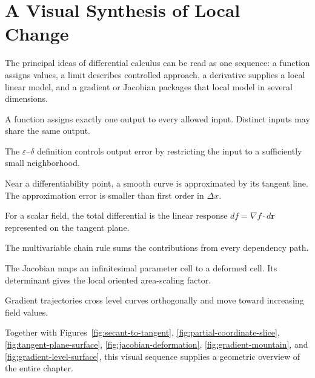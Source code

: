 \section{A Visual Synthesis of Local Change}
\label{sec:calculus-visual-synthesis}

The principal ideas of differential calculus can be read as one sequence: a function assigns values, a limit describes controlled approach, a derivative supplies a local linear model, and a gradient or Jacobian packages that local model in several dimensions.

\begin{bookfigure}[H]{A function assigns exactly one output to every allowed input. Distinct inputs may share the same output.}
\label{fig:function-mapping}

\end{bookfigure}

\begin{bookfigure}[H]{The $\varepsilon$--$\delta$ definition controls output error by restricting the input to a sufficiently small neighborhood.}
\label{fig:epsilon-delta-limit}

\end{bookfigure}

\begin{bookfigure}[H]{Near a differentiability point, a smooth curve is approximated by its tangent line. The approximation error is smaller than first order in $\Delta x$.}
\label{fig:local-linearization}

\end{bookfigure}

\begin{bookfigure}[H]{For a scalar field, the total differential is the linear response $df=\nabla f\cdot d\mathbf r$ represented on the tangent plane.}
\label{fig:total-differential-plane}

\end{bookfigure}

\begin{bookfigure}[H]{The multivariable chain rule sums the contributions from every dependency path.}
\label{fig:chain-rule-graph}

\end{bookfigure}

\begin{bookfigure}[H]{The Jacobian maps an infinitesimal parameter cell to a deformed cell. Its determinant gives the local oriented area-scaling factor.}
\label{fig:jacobian-area}

\end{bookfigure}

\begin{bookfigure}[H]{Gradient trajectories cross level curves orthogonally and move toward increasing field values.}
\label{fig:gradient-flow}

\end{bookfigure}

Together with Figures~\ref{fig:secant-to-tangent}, \ref{fig:partial-coordinate-slice}, \ref{fig:tangent-plane-surface}, \ref{fig:jacobian-deformation}, \ref{fig:gradient-mountain}, and \ref{fig:gradient-level-surface}, this visual sequence supplies a geometric overview of the entire chapter.
